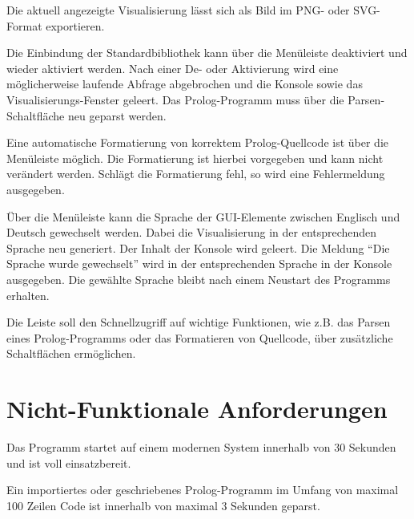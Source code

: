 \documentclass[parskip=full,11pt,twoside]{scrartcl}
\begin{document}
Die aktuell angezeigte Visualisierung lässt sich als Bild im PNG- oder SVG-Format exportieren.


Die Einbindung der Standardbibliothek kann über die Menüleiste deaktiviert und wieder aktiviert werden. Nach einer De- oder Aktivierung wird eine möglicherweise laufende Abfrage abgebrochen und die Konsole sowie das Visualisierungs-Fenster geleert. Das Prolog-Programm muss über die Parsen-Schaltfläche neu geparst werden.


Eine automatische Formatierung von korrektem Prolog-Quellcode ist über die Menüleiste möglich. Die Formatierung ist hierbei vorgegeben und kann nicht verändert werden. Schlägt die Formatierung fehl, so wird eine Fehlermeldung ausgegeben.


Über die Menüleiste kann die Sprache der GUI-Elemente zwischen Englisch und Deutsch gewechselt werden. Dabei die Visualisierung in der entsprechenden Sprache neu generiert. Der Inhalt der Konsole wird geleert. Die Meldung \enquote{Die Sprache wurde gewechselt} wird in der entsprechenden Sprache in der Konsole ausgegeben. Die gewählte Sprache bleibt nach einem Neustart des Programms erhalten.


Die Leiste soll den Schnellzugriff auf wichtige Funktionen, wie z.B. das Parsen eines Prolog-Programms oder das Formatieren von Quellcode, über zusätzliche Schaltflächen ermöglichen.

\section{Nicht-Funktionale Anforderungen}


Das Programm startet auf einem modernen System innerhalb von 30 Sekunden und ist voll einsatzbereit.


Ein importiertes oder geschriebenes Prolog-Programm im Umfang von maximal 100 Zeilen Code ist innerhalb von maximal 3 Sekunden geparst.
\end{document}
